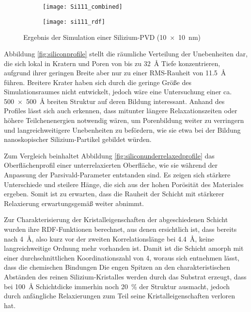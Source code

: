 \begin{figure}
  \captionsetup[subfigure]{singlelinecheck=false}
  \def\subfigwidth{0.48\textwidth}
  \begin{subfigure}[t]{\subfigwidth}
    \texttt{[image: Si111\_combined]}
    \label{fig:siliconresults-a}
  \end{subfigure}
  \begin{subfigure}[t]{\subfigwidth}
    \texttt{[image: si111\_rdf]}
    \label{fig:siliconresults-b}
  \end{subfigure}
  \hfill
  \caption[Ergebnisse der Simulation einer Silizium-PVD]{Ergebnis der Simulation einer Silizium-PVD (\SI{10x10}{\nano\meter})}
  \label{fig:siliconresults}
\end{figure}

Abbildung \ref{fig:siliconprofile} stellt die räumliche Verteilung der Unebenheiten dar, die sich lokal in Kratern und Poren von bis zu \SI{32}{\angstrom} Tiefe konzentrieren, aufgrund ihrer geringen Breite aber nur zu einer RMS-Rauheit von \SI{11.5}{\angstrom} führen.
Breitere Krater haben sich durch die geringe Größe des Simulationsraumes nicht entwickelt, jedoch wäre eine Untersuchung einer ca. \SI{500x500}{\angstrom} breiten Struktur auf deren Bildung interessant.
Anhand des Profiles lässt sich auch erkennen, dass mitunter längere Relaxationszeiten oder höhere Teilchenenergien notwendig wären, um Porenbildung weiter zu verringern und langreichweitigere Unebenheiten zu befördern, wie sie etwa bei der Bildung nanoskopischer Silizium-Partikel gebildet würden.

Zum Vergleich beinhaltet Abbildung \ref{fig:siliconunderrelaxedprofile} das Oberflächenprofil einer unterrelaxierten Oberfläche, wie sie während der Anpassung der Parsivald-Parameter entstanden sind.
Es zeigen sich stärkere Unterschiede und steilere Hänge, die sich aus der hohen Porösität des Materiales ergeben.
Somit ist zu erwarten, dass die Rauheit der Schicht mit stärkerer Relaxierung erwartungsgemäß weiter abnimmt.

Zur Charakterisierung der Kristalleigenschaften der abgeschiedenen Schicht wurden ihre RDF-Funktionen berechnet, aus denen ersichtlich ist, dass bereits nach \SI{4}{\angstrom}, also kurz vor der zweiten Korrelationslänge bei \SI{4.4}{\angstrom}, keine langreichweitige Ordnung mehr vorhanden ist.
Damit ist die Schicht amorph mit einer durchschnittlichen Koordinationszahl von \num{4}, woraus sich entnehmen lässt, dass die chemischen Bindungen
Die engen Spitzen an den charakteristischen Abständen des reinen Silizium-Kristalles werden durch das Substrat erzeugt, dass bei \SI{100}{\angstrom} Schichtdicke immerhin noch \SI{20}{\percent} der Struktur ausmacht, jedoch durch anfängliche Relaxierungen zum Teil seine Kristalleigenschaften verloren hat.

